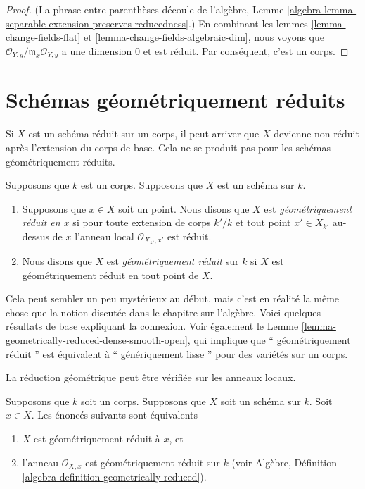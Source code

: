 \begin{proof}
(La phrase entre parenthèses découle de l'algèbre, Lemme
\ref{algebra-lemma-separable-extension-preserves-reducedness}.)
En combinant les lemmes \ref{lemma-change-fields-flat} et
\ref{lemma-change-fields-algebraic-dim}, nous voyons que
$\mathcal{O}_{Y, y}/\mathfrak m_x \mathcal{O}_{Y, y}$ a une
dimension $0$ et est réduit. Par conséquent, c'est un corps.
\end{proof}





\section{Schémas géométriquement réduits}
\label{section-geometrically-reduced}

\noindent
Si $X$ est un schéma réduit sur un corps, il peut arriver que
$X$ devienne non réduit après l'extension du corps de base.
Cela ne se produit pas pour les schémas géométriquement réduits.

\begin{definition}
\label{definition-geometrically-reduced}
Supposons que $k$ est un corps.
Supposons que $X$ est un schéma sur $k$.
\begin{enumerate}
\item Supposons que $x \in X$ soit un point. Nous
disons que $X$ est {\it géométriquement réduit en $x$
} si pour toute extension de corps $k'/k$ et tout
point $x' \in X_{k'}$ au-dessus de $x$ l'anneau local
$\mathcal{O}_{X_{k'}, x'}$ est réduit. \item Nous
disons que $X$ est {\it géométriquement réduit } sur $k$
si $X$ est géométriquement réduit en tout point de $X$.
\end{enumerate}
\end{definition}

\noindent
Cela peut sembler un peu mystérieux au début, mais c'est en
réalité la même chose que la notion discutée dans le chapitre sur
l'algèbre. Voici quelques résultats de base expliquant la
connexion. Voir également le Lemme
\ref{lemma-geometrically-reduced-dense-smooth-open}, qui implique que ``
géométriquement réduit '' est équivalent à `` génériquement lisse '' pour des variétés sur un corps.

\begin{lemma}
\label{lemma-geometrically-reduced-at-point}
\begin{slogan}
La réduction géométrique peut être vérifiée sur les anneaux locaux.
\end{slogan}
Supposons que $k$ soit un corps.
Supposons que $X$ soit un schéma
sur $k$. Soit $x \in X$. Les
énoncés suivants sont équivalents
\begin{enumerate}
\item $X$ est géométriquement réduit à $x$, et
\item l’anneau $\mathcal{O}_{X, x}$ est
géométriquement réduit sur $k$ (voir Algèbre,
Définition \ref{algebra-definition-geometrically-reduced}).
\end{enumerate}
\end{lemma}

